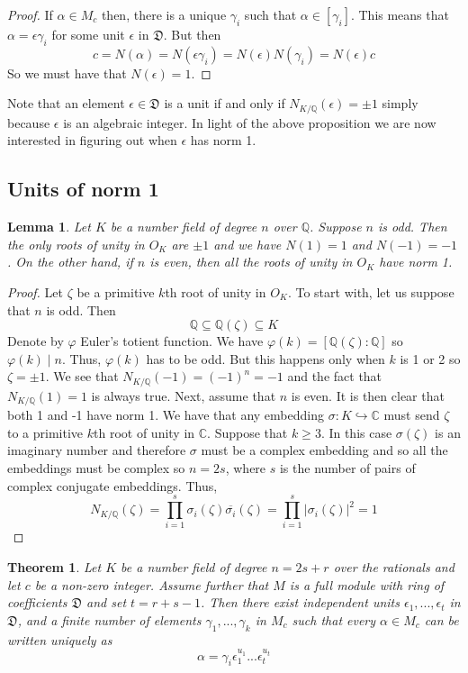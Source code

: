 \documentclass{article}
\newtheorem{theorem}{Theorem}[section]
\newtheorem{lemma}{Lemma}[section]
\newcommand{\mfrak}[1]{\mathfrak{#1}}
\newcommand{\mbb}[1]{\mathbb{#1}}
\numberwithin{equation}{section}
\begin{document}
\begin{proof}
    If $\alpha \in M_c$ then, there is a unique $\gamma_i$ such that $\alpha \in [\gamma_i]$. This means that $\alpha = \epsilon \gamma_i$ for some unit $\epsilon$ in $\mfrak D$. But then $$c = N(\alpha) = N(\epsilon \gamma_i) = N(\epsilon)N(\gamma_i) = N(\epsilon)c$$
    So we must have that $N(\epsilon) = 1$.
\end{proof}
Note that an element $\epsilon \in \mfrak D$ is a unit if and only if $N_{K/\mbb Q}(\epsilon) = \pm 1$ simply because $\epsilon$ is an algebraic integer. In light of the above proposition we are now interested in figuring out when $\epsilon$ has norm 1.

\subsection{Units of norm 1}

\begin{lemma}\label{lem: norm of primitive roots}
    Let $K$ be a number field of degree $n$ over $\mbb Q$. Suppose $n$ is odd. Then the only roots of unity in $O_K$ are $\pm 1$ and we have $N(1) = 1$ and $N(-1) = -1$. On the other hand, if $n$ is even, then all the roots of unity in $O_K$ have norm 1.
\end{lemma}
\begin{proof}
    Let $\zeta$ be a primitive $k$th root of unity in $O_K$. To start with, let us suppose that $n$ is odd. Then
    $$\mbb Q \subseteq \mbb Q(\zeta) \subseteq K$$
    Denote by $\varphi$ Euler's totient function. We have $\varphi(k) = [\mbb Q(\zeta) : \mbb Q]$ so $\varphi(k) \mid n$. Thus, $\varphi(k)$ has to be odd. But this happens only when $k$ is 1 or 2 so $\zeta = \pm 1$. We see that $N_{K/\mbb Q}(-1) = (-1)^n = -1$ and the fact that $N_{K / \mbb Q}(1) = 1$ is always true. Next, assume that $n$ is even. It is then clear that both 1 and -1 have norm 1. We have that any embedding $\sigma : K \hookrightarrow \mbb C$ must send $\zeta$ to a primitive $k$th root of unity in $\mbb C$. Suppose that $k \geq 3$. In this case $\sigma(\zeta)$ is an imaginary number and therefore $\sigma$ must be a complex embedding and so all the embeddings must be complex so $n = 2s$, where $s$ is the number of pairs of complex conjugate embeddings. Thus,
    $$N_{K /\mbb Q}(\zeta)  = \prod_{i=1}^s \sigma_i(\zeta) \overline{\sigma_i}(\zeta) = \prod_{i=1}^s |\sigma_i(\zeta)|^2 = 1$$
\end{proof}


\begin{theorem}\label{thm: Shape of solutions to N(x) = c for x in full module}
    Let $K$ be a number field of degree $n = 2s + r$ over the rationals and let $c$ be a non-zero integer. Assume further that $M$ is a full module with ring of coefficients $\mfrak D$ and set $t = r+s-1$. Then there exist independent units $\epsilon_1, ..., \epsilon_t$ in $\mfrak D$, and a finite number of elements $\gamma_1, ..., \gamma_k$ in $M_c$ such that every $\alpha \in M_c$ can be written uniquely as
    $$\alpha = \gamma_i \epsilon_1^{u_1} ... \epsilon_t^{u_t}$$
\end{theorem}
\end{document}
